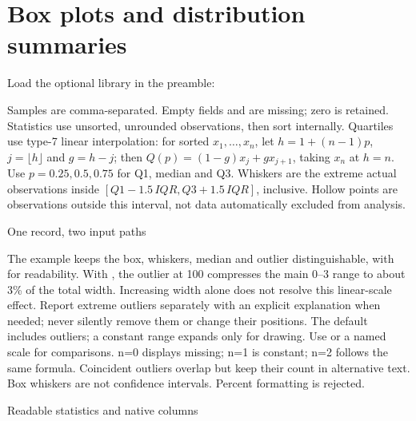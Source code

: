 \section{Box plots and distribution summaries}
Load the optional  library in the preamble:
\begin{source}
\end{source}
Samples are comma-separated. Empty fields and  are missing; zero is
retained. Statistics use unsorted, unrounded observations, then sort internally.
Quartiles use type-7 linear interpolation: for sorted $x_1,\ldots,x_n$, let
$h=1+(n-1)p$, $j=\lfloor h\rfloor$ and $g=h-j$; then
$Q(p)=(1-g)x_j+gx_{j+1}$, taking $x_n$ at $h=n$.
Use $p=0.25,0.5,0.75$ for Q1, median and Q3. Whiskers are the extreme actual
observations inside $[Q1-1.5\,IQR,Q3+1.5\,IQR]$, inclusive. Hollow points are
observations outside this interval, not data automatically excluded from analysis.
\begin{demo}{One record, two input paths}
\quad
{}
\end{demo}
The example keeps the box, whiskers, median and outlier distinguishable,
with  for readability. With , the outlier
at 100 compresses the main 0--3 range to about 3\% of the total width.
Increasing width alone does not resolve this linear-scale effect. Report
extreme outliers separately with an explicit explanation when needed; never
silently remove them or change their positions.
The default  includes outliers; a constant range expands
only for drawing. Use  or a named scale
for comparisons. n=0 displays missing; n=1 is constant; n=2 follows the same
formula. Coincident outliers overlap but keep their count in alternative text.
Box whiskers are not confidence intervals. Percent formatting is rejected.
\begin{demo}{Readable statistics and native columns}
\par\medskip
\begin{center}
\begin{gradtable}[align=c,header align=c,style=distribution,width=\linewidth,scale=column]
\end{gradtable}
\end{center}
\end{demo}
